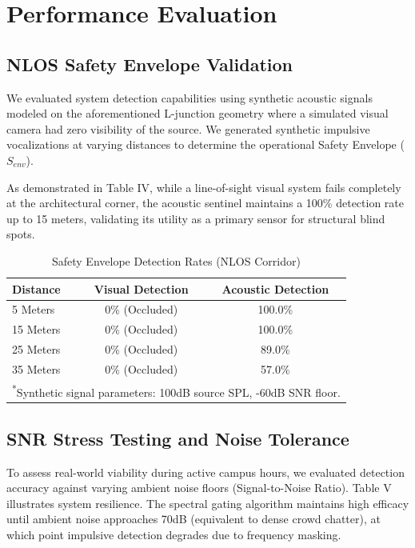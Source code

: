 \documentclass[conference]{IEEEtran}
\begin{document}
\section{Performance Evaluation}

\subsection{NLOS Safety Envelope Validation}
We evaluated system detection capabilities using synthetic acoustic signals modeled on the aforementioned L-junction geometry where a simulated visual camera had zero visibility of the source. We generated synthetic impulsive vocalizations at varying distances to determine the operational Safety Envelope ($S_{env}$).

As demonstrated in Table IV, while a line-of-sight visual system fails completely at the architectural corner, the acoustic sentinel maintains a 100\% detection rate up to 15 meters, validating its utility as a primary sensor for structural blind spots.

\begin{table}[htbp]
\caption{Safety Envelope Detection Rates (NLOS Corridor)}
\begin{center}
\begin{tabular}{lcc}
\toprule
\textbf{Distance} & \textbf{Visual Detection} & \textbf{Acoustic Detection} \\
\midrule
5 Meters & 0\% (Occluded) & 100.0\% \\
15 Meters & 0\% (Occluded) & 100.0\% \\
25 Meters & 0\% (Occluded) & 89.0\% \\
35 Meters & 0\% (Occluded) & 57.0\% \\
\bottomrule
\multicolumn{3}{l}{\textsuperscript{*}\footnotesize Synthetic signal parameters: 100dB source SPL, -60dB SNR floor.}
\end{tabular}
\end{center}
\label{tab:blindspot}
\end{table}

\subsection{SNR Stress Testing and Noise Tolerance}
To assess real-world viability during active campus hours, we evaluated detection accuracy against varying ambient noise floors (Signal-to-Noise Ratio). Table V illustrates system resilience. The spectral gating algorithm maintains high efficacy until ambient noise approaches 70dB (equivalent to dense crowd chatter), at which point impulsive detection degrades due to frequency masking.
\end{document}
